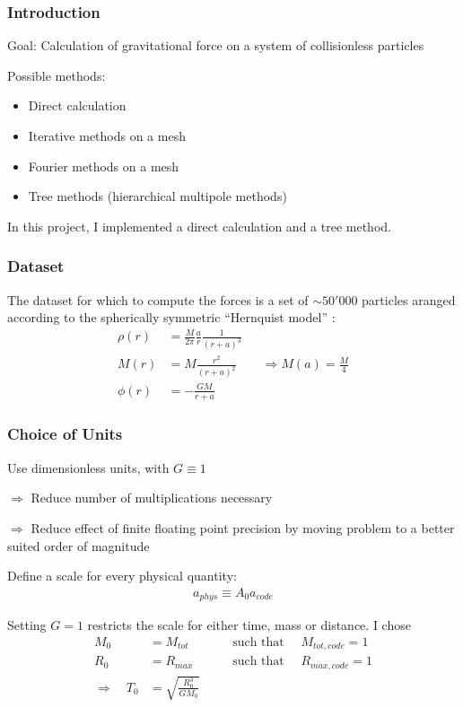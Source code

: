 \begin{frame}
	\frametitle{Introduction}
	
	Goal: Calculation of gravitational force on a system of collisionless particles
	
	Possible methods:
	
	\begin{itemize}
		\item Direct calculation
		\item Iterative methods on a mesh
		\item Fourier methods on a mesh
		\item Tree methods (hierarchical multipole methods)
	\end{itemize}

	In this project, I implemented a direct calculation and a tree method.
\end{frame}







\begin{frame}
	\frametitle{Dataset}
	The dataset for which to compute the forces is a set of $\sim 50'000$ particles aranged according to the spherically symmetric ``Hernquist model'' :
	\begin{align*}
		\rho(r) &= \frac{M}{2\pi}\frac{a}{r}\frac{1}{(r+a)^3}\\
		M(r) &= M \frac{r^2}{(r+a)^2} \quad\quad \Rightarrow M(a) = \frac{M}{4}\\
		\phi(r) &= - \frac{GM}{r+a}
	\end{align*}
\end{frame}




\begin{frame}
	\frametitle{Choice of Units}
	
	Use dimensionless units, with $G \equiv 1$
	
	$\Rightarrow$ Reduce number of multiplications necessary
	
	$\Rightarrow$ Reduce effect of finite floating point precision by moving problem to a better suited order of magnitude
	
	Define a scale for every physical quantity:
	\begin{align*}
		a_{phys} \equiv A_0 a_{code}
	\end{align*}
	
	Setting $G = 1$ restricts the scale for either time, mass or distance. I chose
	\begin{align*}
		M_0 &= M_{tot}	\quad\quad &\text{ such that } \quad M_{tot, code} = 1\\
		R_0 &= R_{max}	\quad\quad &\text{ such that } \quad R_{max, code} = 1\\
		\Rightarrow \quad T_0 &= \sqrt{ \frac{R_0^3}{G M_0}} &
	\end{align*}
	
\end{frame}





